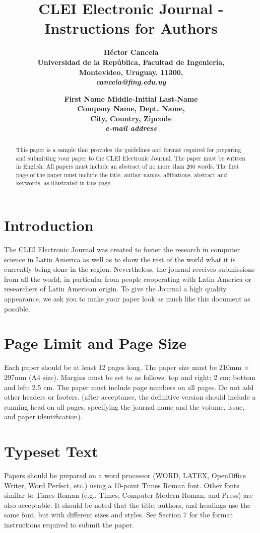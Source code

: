 \documentclass{cleiej}
\title{CLEI Electronic Journal - Instructions for Authors}
\author{
\bf Héctor Cancela\\
Universidad de la República, Facultad de Ingeniería,\\
Montevideo, Uruguay, 11300, \\
\it cancela@fing.edu.uy
\and
\bf First Name Middle-Initial Last-Name \\
Company Name, Dept. Name,\\
City, Country, Zipcode \\
\it e-mail address
}
\begin{document}
\maketitle

\begin{abstract}

\noindent This paper is a sample that provides the guidelines and 
format required for preparing and submitting your paper to the 
CLEI Electronic Journal. The paper must be written in English. 
All papers must include an abstract of no more than 200 words. 
The first page of the paper must include the title, author names, 
affiliations, abstract and keywords, as illustrated in this page.  
\end{abstract}



\section{Introduction}

The CLEI Electronic Journal was created to foster the research 
in computer science in Latin America as well as to show the rest 
of the world what it is currently being done in the region. Nevertheless, 
the journal receives submissions from all the world, in particular from 
people cooperating with Latin America or researchers of Latin American origin. 
To give the Journal a high quality appearance, we ask you to make your 
paper look as much like this document as possible. 

\section{Page Limit and Page Size}
Each paper should be at least 12 pages long. The paper size must be 
210mm $\times$ 297mm (A4 size). Margins must be set to as follows: 
top and right: 2 cm; bottom and left: 2.5 cm. The paper must include 
page numbers on all pages.  Do not add other headers or footers. 
(after acceptance, the definitive version should include a running head on all pages, specifying the journal name and the volume, issue, and paper identification). 

\section{Typeset Text}
Papers should be prepared on a word processor (WORD, LATEX, OpenOffice Writer, 
Word Perfect, etc.) using a 10-point Times Roman font. Other fonts similar 
to Times Roman (e.g., Times, Computer Modern Roman, and Press) are also acceptable. 
It should be noted that the title, authors, and headings use the same font, 
but with different sizes and styles. See Section 7 for the format instructions required 
to submit the paper.
\end{document}
